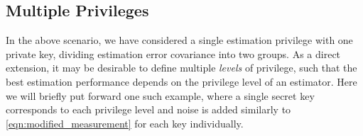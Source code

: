 \documentclass[letterpaper, 10 pt, conference]{ieeeconf}
\begin{document}
% 
% 

\subsection{Multiple Privileges}\label{subsec:mult_privileges}
In the above scenario, we have considered a single estimation privilege with one private key, dividing estimation error covariance into two groups. As a direct extension, it may be desirable to define multiple \textit{levels} of privilege, such that the best estimation performance depends on the privilege level of an estimator. Here we will briefly put forward one such example, where a single secret key corresponds to each privilege level and noise is added similarly to \eqref{eqn:modified_measurement} for each key individually.
\end{document}
